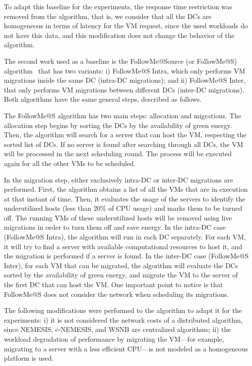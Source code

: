 To adapt this baseline for the experiments, the response time restriction was removed from the algorithm, that is, we consider that all the DCs are homogeneous in terms of latency for the VM request, since the used workloads do not have this data, and this modification does not change the behavior of the algorithm.


The second work used as a baseline is the FollowMe@Source (or FollowMe@S) algorithm~\cite{ALI2021110907} that has two variants: i) FollowMe@S Intra, which only performs VM migrations inside the same DC (intra-DC migrations);  and ii) FollowMe@S Inter, that only performs VM migrations between different DCs (inter-DC migrations). Both algorithms have the same general steps, described as follows.

The FollowMe@S algorithm has two main steps: allocation and migrations. The allocation step begins by sorting the DCs by the availability of green energy. Then, the algorithm will search for a server that can host the VM, respecting the sorted list of DCs. If no server is found after searching through all DCs, the VM will be processed in the next scheduling round. The process will be executed again for all the other VMs to be scheduled. 

In the migration step, either exclusively intra-DC or inter-DC migrations are performed. First, the algorithm obtains a list of all the VMs that are in execution at that instant of time. Then, it evaluates the usage of the servers to identify the underutilized hosts (less than 20\% of CPU usage) and marks them to be turned off. The running VMs of these underutilized hosts will be removed using live migrations in order to turn them off and save energy. In the intra-DC case (FollowMe@S Intra), the algorithm will run in each DC separately. For each VM, it will try to find a server with available computational resources to host it, and the migration is performed if a server is found. In the inter-DC case (FollowMe@S Inter), for each VM that can be migrated, the algorithm will evaluate the DCs sorted by the availability of green energy, and migrate the VM to the server of the first DC that can host the VM. One important point to notice is that FollowMe@S does not consider the network when scheduling its migrations. 

The following modifications were performed to the algorithm to adapt it for the experiments: i) it is not considered the network costs of a distributed algorithm, since NEMESIS, c-NEMESIS, and WSNB are centralized algorithms; ii) the workload degradation of performance by migrating the VM---for example, migrating to a server with a less efficient CPU---is not modeled as a homogeneous platform is used.

